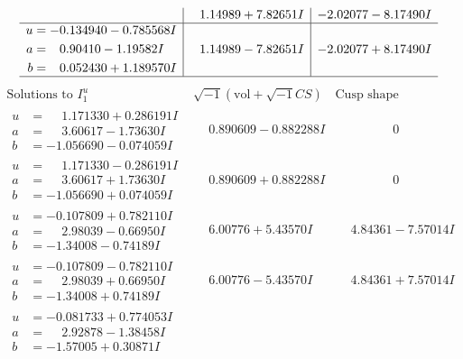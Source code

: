 \documentclass[1p]{elsarticle_modified}
\theoremstyle{definition}
\newcommand{\I}{\sqrt{-1}}
\begin{document}
$$\begin{array}{c|c|c}
 & \phantom{-}1.14989 + 7.82651 I & -2.02077 - 8.17490 I \\ \hline\begin{aligned}
u &= -0.134940 - 0.785568 I \\
a &= \phantom{-}0.90410 - 1.19582 I \\
b &= \phantom{-}0.052430 + 1.189570 I\end{aligned}
 & \phantom{-}1.14989 - 7.82651 I & -2.02077 + 8.17490 I\\
 \hline 
 \end{array}$$\newpage$$\begin{array}{c|c|c}  
\text{Solutions to }I^u_{1}& \I (\text{vol} + \sqrt{-1}CS) & \text{Cusp shape}\\
 \hline 
\begin{aligned}
u &= \phantom{-}1.171330 + 0.286191 I \\
a &= \phantom{-}3.60617 - 1.73630 I \\
b &= -1.056690 - 0.074059 I\end{aligned}
 & \phantom{-}0.890609 - 0.882288 I & \phantom{-0.000000 } 0 \\ \hline\begin{aligned}
u &= \phantom{-}1.171330 - 0.286191 I \\
a &= \phantom{-}3.60617 + 1.73630 I \\
b &= -1.056690 + 0.074059 I\end{aligned}
 & \phantom{-}0.890609 + 0.882288 I & \phantom{-0.000000 } 0 \\ \hline\begin{aligned}
u &= -0.107809 + 0.782110 I \\
a &= \phantom{-}2.98039 - 0.66950 I \\
b &= -1.34008 - 0.74189 I\end{aligned}
 & \phantom{-}6.00776 + 5.43570 I & \phantom{-}4.84361 - 7.57014 I \\ \hline\begin{aligned}
u &= -0.107809 - 0.782110 I \\
a &= \phantom{-}2.98039 + 0.66950 I \\
b &= -1.34008 + 0.74189 I\end{aligned}
 & \phantom{-}6.00776 - 5.43570 I & \phantom{-}4.84361 + 7.57014 I \\ \hline\begin{aligned}
u &= -0.081733 + 0.774053 I \\
a &= \phantom{-}2.92878 - 1.38458 I \\
b &= -1.57005 + 0.30871 I\end{aligned}

\end{array}$$
\end{document}
